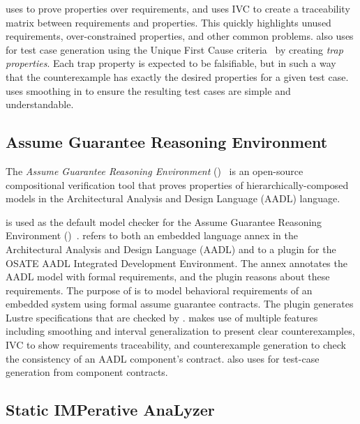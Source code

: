 \spear uses \jkind to prove properties over requirements, and uses IVC
to create a traceability matrix between requirements and properties.
This quickly highlights unused requirements, over-constrained
properties, and other common problems. \spear also uses \jkind for
test case generation using the Unique First Cause
criteria~\cite{whalen2006issta} by creating {\em trap properties}.
Each trap property is expected to be falsifiable, but in such a way
that the counterexample has exactly the desired properties for a given
test case. \spear uses smoothing in \jkind to ensure the resulting
test cases are simple and understandable.

\subsection{Assume Guarantee Reasoning Environment}

 The {\em Assume Guarantee Reasoning Environment} (\agree)~\cite{cofer2012nfm,QFCS15:backes,hilt2013} is an open-source compositional verification tool that proves properties of hierarchically-composed models in the Architectural Analysis and Design Language (AADL) language.  %
%

\noindent \jkind is used as the default model checker for the Assume
Guarantee Reasoning Environment (\agree)~\cite{cofer2012nfm}. \agree
refers to both an embedded language annex in the Architectural
Analysis and Design Language (AADL) and to a plugin for the OSATE AADL
Integrated Development Environment. The \agree annex annotates the
AADL model with formal requirements, and the plugin reasons about
these requirements. The purpose of \agree is to model behavioral
requirements of an embedded system using formal assume guarantee
contracts. The plugin generates Lustre specifications that are checked
by \jkind.
%
\agree makes use of multiple \jkind features including smoothing and
interval generalization to present clear counterexamples, IVC to show
requirements traceability, and counterexample generation to check the
consistency of an AADL component's contract. \agree also uses \jkind
for test-case generation from component contracts.

\subsection{Static IMPerative AnaLyzer}

